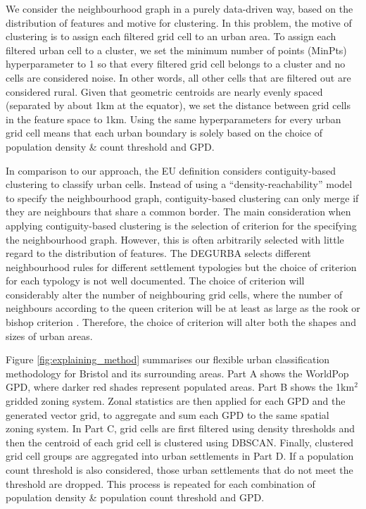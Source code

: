 \documentclass[review]{elsarticle}
\begin{document}
	We consider the neighbourhood graph in a purely data-driven way, based on the distribution of features and motive for clustering.
	In this problem, the motive of clustering is to assign each filtered grid cell to an urban area.
	To assign each filtered urban cell to a cluster, we set the minimum number of points (MinPts) hyperparameter to 1 so that every filtered grid cell belongs to a cluster and no cells are considered noise.
	In other words, all other cells that are filtered out are considered rural.
	Given that geometric centroids are nearly evenly spaced (separated by about 1km 
	at the equator), we set the distance between grid cells in the feature space to 1km.	
	Using the same hyperparameters for every urban grid cell means that each urban boundary is solely based on the choice of population density \& count threshold and GPD.
	
	In comparison to our approach, the EU definition considers contiguity-based clustering to classify urban cells.
	Instead of using a ``density-reachability'' model to specify the neighbourhood graph, contiguity-based clustering can only merge if they are neighbours that share a common border.
	The main consideration when applying contiguity-based clustering is the selection of criterion for the specifying the neighbourhood graph.
	However, this is often arbitrarily selected with little regard to the distribution of features.
	The DEGURBA selects different neighbourhood rules for different settlement typologies \cite{OECD2020} but the choice of criterion for each typology is not well documented.
	The choice of criterion will considerably alter the number of neighbouring grid cells, where the number of neighbours according to the queen criterion will be at least as large as the rook or bishop criterion \cite{Anselin2002}.
	Therefore, the choice of criterion will alter both the shapes and sizes of urban areas.
	
	
	Figure \ref{fig:explaining_method} summarises our flexible urban classification methodology for Bristol and its surrounding areas.
	Part A shows the WorldPop GPD, where darker red shades represent populated areas.  
	Part B shows the 1km$^2$ gridded zoning system.
	Zonal statistics are then applied for each GPD and the generated vector grid, to aggregate and sum each GPD to the same spatial zoning system.  
	In Part C, grid cells are first filtered using density thresholds and then the centroid of each grid cell is clustered using DBSCAN.
	Finally, clustered grid cell groups are aggregated into urban settlements in Part D.
	If a population count threshold is also considered, those urban settlements that do not meet the threshold are dropped.
	This process is repeated for each combination of population density \& population count threshold and GPD.
	
\end{document}
